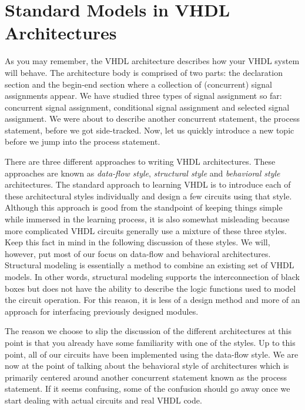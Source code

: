 %
%
%
\chapter{Standard Models in VHDL Architectures}
As you may remember, the VHDL architecture describes how your VHDL system will behave. The architecture body is comprised of two parts: the declaration section and the begin-end section where a collection of (concurrent) signal assignments appear. We have studied three types of signal assignment so far: concurrent signal assignment, conditional signal assignment and selected signal assignment. We were about to describe another concurrent statement, the process statement, before we got side-tracked. Now, let us quickly introduce a new topic before we jump into the process statement.

There are three different approaches to writing VHDL architectures. These approaches are known as \textit{data-flow style}, \textit{structural style} and \textit{behavioral style} architectures. The standard approach to learning VHDL is to introduce each of these architectural styles individually and design a few circuits using that style. Although this approach is good from the standpoint of keeping things simple while immersed in the learning process, it is also somewhat misleading because more complicated VHDL circuits generally use a mixture of these three styles. Keep this fact in mind in the following discussion of these styles. We will, however, put most of our focus on data-flow and behavioral architectures. Structural modeling is essentially a method to combine an existing set of VHDL models. In other words, structural modeling supports the interconnection of black boxes but does not have the ability to describe the logic functions used to model the circuit operation. For this reason, it is less of a design method and more of an approach for interfacing previously designed modules.

The reason we choose to slip the discussion of the different architectures at this point is that you already have some familiarity with one of the styles. Up to this point, all of our circuits have been implemented using the data-flow style. We are now at the point of talking about the behavioral style of architectures which is primarily centered around another concurrent statement known as the process statement. If it seems confusing, some of the confusion should go away once we start dealing with actual circuits and real VHDL code.

